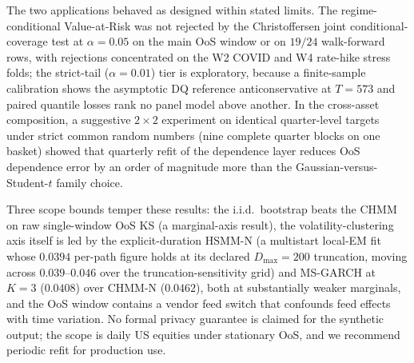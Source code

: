 The two applications behaved as designed within stated limits. The regime-conditional Value-at-Risk was not rejected by the Christoffersen joint conditional-coverage test at $\alpha = 0.05$ on the main OoS window or on $19/24$ walk-forward rows, with rejections concentrated on the W2 COVID and W4 rate-hike stress folds; the strict-tail ($\alpha = 0.01$) tier is exploratory, because a finite-sample calibration shows the asymptotic DQ reference anticonservative at $T = 573$ and paired quantile losses rank no panel model above another. In the cross-asset composition, a suggestive $2 \times 2$ experiment on identical quarter-level targets under strict common random numbers (nine complete quarter blocks on one basket) showed that quarterly refit of the dependence layer reduces OoS dependence error by an order of magnitude more than the Gaussian-versus-Student-$t$ family choice.

Three scope bounds temper these results: the i.i.d.\ bootstrap beats the CHMM on raw single-window OoS KS (a marginal-axis result), the volatility-clustering axis itself is led by the explicit-duration HSMM-N (a multistart local-EM fit whose $0.0394$ per-path figure holds at its declared $D_{\max} = 200$ truncation, moving across $0.039$--$0.046$ over the truncation-sensitivity grid) and MS-GARCH at $K = 3$ ($0.0408$) over CHMM-N ($0.0462$), both at substantially weaker marginals, and the OoS window contains a vendor feed switch that confounds feed effects with time variation. No formal privacy guarantee is claimed for the synthetic output; the scope is daily US equities under stationary OoS, and we recommend periodic refit for production use.

